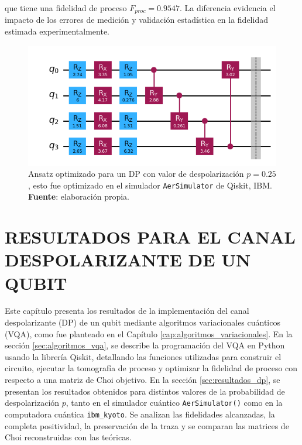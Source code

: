 \documentclass[letterpaper,12pt]{thesisECFM}
\theoremstyle{plain}
\theoremstyle{definition}
\theoremstyle{definition}
\theoremstyle{remark}
\newcommand{\1}{\mathbb{1}}
\begin{document}
que tiene una fidelidad de proceso $F_{proc} = 0.9547$. La diferencia evidencia el impacto de los errores de medición y validación estadística en la fidelidad estimada experimentalmente.



\begin{figure}[h!] 
    \centering 
    \includegraphics[width=0.70\linewidth]{imagenes/ansatz_p025_v2.png}
    \caption{Ansatz optimizado para un DP con valor de despolarización $p=0.25$, esto fue optimizado en el simulador \texttt{AerSimulator} de Qiskit, IBM. \textbf{Fuente}: elaboración propia. }
    \label{fig:ansatz_p025}
    \end{figure}


\chapter{RESULTADOS PARA EL CANAL DESPOLARIZANTE DE UN QUBIT } \label{cap:resultados} %
Este capítulo presenta los resultados de la implementación del canal despolarizante (DP) de un qubit mediante algoritmos variacionales cuánticos (VQA), como fue planteado en el Capítulo \ref{cap:algoritmos_variacionales}. En la sección \ref{sec:algoritmos_vqa}, se describe la programación del VQA en Python usando la librería Qiskit, detallando las funciones utilizadas para construir el circuito, ejecutar la tomografía de proceso y optimizar la fidelidad de proceso con respecto a una matriz de Choi objetivo. En la sección \ref{sec:resultados_dp}, se presentan los resultados obtenidos para distintos valores de la probabilidad de despolarización $p$, tanto en el simulador cuántico \texttt{AerSimulator()} como en la computadora cuántica \texttt{ibm\_kyoto}. Se analizan las fidelidades alcanzadas, la completa positividad, la preservación de la traza y se comparan las matrices de Choi reconstruidas con las teóricas. 
\end{document}
